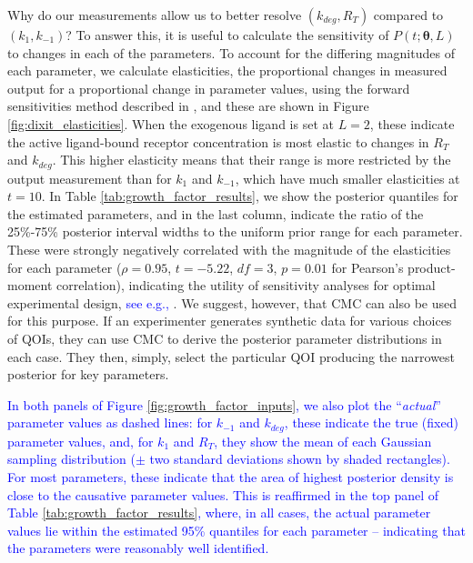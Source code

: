 Why do our measurements allow us to better resolve $(k_{deg},R_T)$ compared to $(k_1,k_{-1})$? To answer this, it is useful to calculate the sensitivity of $P(t; \boldsymbol{\theta}, L)$ to changes in each of the parameters. To account for the differing magnitudes of each parameter, we calculate elasticities, the proportional changes in measured output for a proportional change in parameter values, using the forward sensitivities method described in \cite{DGCT2018}, and these are shown in Figure \ref{fig:dixit_elasticities}. When the exogenous ligand is set at $L=2$, these indicate the active ligand-bound receptor concentration is most elastic to changes in $R_T$ and $k_{deg}$. This higher elasticity means that their range is more restricted by the output measurement than for $k_1$ and $k_{-1}$, which have much smaller elasticities at $t=10$. In Table \ref{tab:growth_factor_results}, we show the posterior quantiles for the estimated parameters, and in the last column, indicate the ratio of the 25\%-75\% posterior interval widths to the uniform prior range for each parameter. These were strongly negatively correlated with the magnitude of the elasticities for each parameter ($\rho=0.95$, $t=-5.22$, $df=3$, $p=0.01$ for Pearson's product-moment correlation), indicating the utility of sensitivity analyses for optimal experimental design, \textcolor{blue}{see e.g., \cite{Banks2011}}. We suggest, however, that CMC can also be used for this purpose. If an experimenter generates synthetic data for various choices of QOIs, they can use CMC to derive the posterior parameter distributions in each case. They then, simply, select the particular QOI producing the narrowest posterior for key parameters.

\textcolor{blue}{In both panels of Figure \ref{fig:growth_factor_inputs}, we also plot the ``\textit{actual}'' parameter values as dashed lines: for $k_{-1}$ and $k_{deg}$, these indicate the true (fixed) parameter values, and, for $k_1$ and $R_T$, they show the mean of each Gaussian sampling distribution ($\pm$ two standard deviations shown by shaded rectangles). For most parameters, these indicate that the area of highest posterior density is close to the causative parameter values. This is reaffirmed in the top panel of Table \ref{tab:growth_factor_results}, where, in all cases, the actual parameter values lie within the estimated 95\% quantiles for each parameter -- indicating that the parameters were reasonably well identified.}


